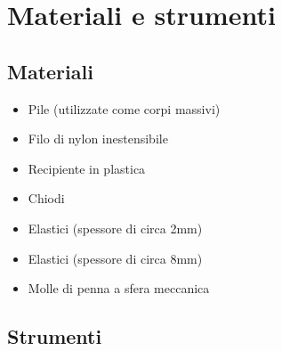 \section*{Materiali e strumenti}
\subsection*{Materiali}
\begin{itemize}
  \item Pile (utilizzate come corpi massivi)
  \item Filo di nylon inestensibile
  \item Recipiente in plastica
  \item Chiodi
  \item Elastici (spessore di circa 2mm)
  \item Elastici (spessore di circa 8mm)
  \item Molle di penna a sfera meccanica
\end{itemize}

\subsection*{Strumenti}

